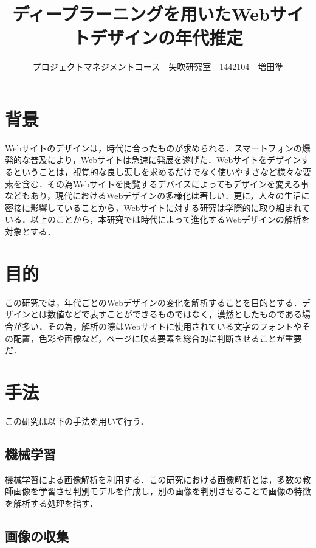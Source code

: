 \documentclass[uplatex,twocolumn,dvipdfmx]{jsarticle}
\title{\vspace{-5mm}\fontsize{14pt}{0pt}\selectfont ディープラーニングを用いたWebサイトデザインの年代推定}
\author{\normalsize プロジェクトマネジメントコース　矢吹研究室　1442104　増田準}
\date{}
\begin{document}
\fontsize{10.5pt}{\baselineskip}\selectfont
\maketitle





\section{背景}

Webサイトのデザインは，時代に合ったものが求められる\cite{bib002}．スマートフォンの爆発的な普及により，Webサイトは急速に発展を遂げた．Webサイトをデザインするということは，視覚的な良し悪しを求めるだけでなく使いやすさなど様々な要素を含む．その為Webサイトを閲覧するデバイスによってもデザインを変える事などもあり，現代におけるWebデザインの多様化は著しい．更に，人々の生活に密接に影響していることから，Webサイトに対する研究は学際的に取り組まれている\cite{bib001}．以上のことから，本研究では時代によって進化するWebデザインの解析を対象とする．

\section{目的}

この研究では，年代ごとのWebデザインの変化を解析することを目的とする．デザインとは数値などで表すことができるものではなく，漠然としたものである場合が多い．その為，解析の際はWebサイトに使用されている文字のフォントやその配置，色彩や画像など，ページに映る要素を総合的に判断させることが重要だ．

\section{手法}

この研究は以下の手法を用いて行う．

\subsection{機械学習}

機械学習による画像解析を利用する．この研究における画像解析とは，多数の教師画像を学習させ判別モデルを作成し，別の画像を判別させることで画像の特徴を解析する処理を指す．


\subsection{画像の収集}
\end{document}
